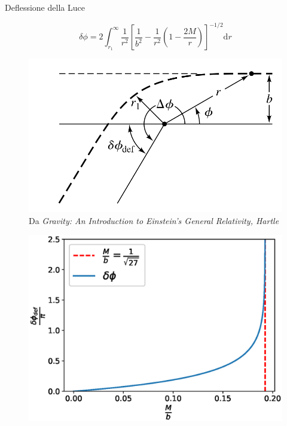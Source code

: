 \begin{frame}{Deflessione della Luce}

    \begin{equation*}
        \delta \phi = 2\int_{r_1}^\infty \frac{1}{r^2} \left[\frac{1}{b^2}
        - \frac{1}{r^2} \left(1 - \frac{2M}{r} \right) \right]^{-1/2} \mathrm{d}r
    \end{equation*}

    \begin{minipage}{0.49 \textwidth}
        \begin{figure}
            \centering
            \includegraphics[width=\textwidth]{Figures/ch1/deflection.png}
            \caption{Da \textit{Gravity: An Introduction to Einstein's General Relativity, Hartle}}
        \end{figure}
    \end{minipage}
    \begin{minipage}{0.49 \textwidth}
        \begin{figure}
            \centering
            \includegraphics[width=\textwidth]{Figures/ch1/deflection_w.eps}
        \end{figure}
    \end{minipage}

\end{frame}
